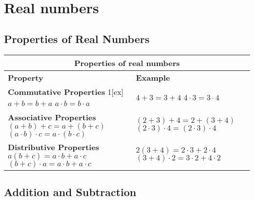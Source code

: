 \section{Real numbers}

\subsection{Properties of Real Numbers}

\begin{tabularx}{1\textwidth}{
    p{}
    p{}
}
\toprule
\multicolumn{2}{c}{\textbf{Properties of real numbers}} \\
\midrule

\textbf{Property} & \textbf{Example}\\
\midrule

\makecell[l]{
    \textbf{Commutative Properties} \\ 1[ex]
    $a + b = b + a$ \\ 
    $a \cdot b = b \cdot a$
} 
& 
\makecell[l]{
    $4 + 3 = 3 + 4$ \\ 
    $4 \cdot 3 = 3 \cdot 4$
} 
\\
\midrule

\makecell[l]{
    \textbf{Associative Properties} \\[1ex] 
    $(a + b) + c = a + (b + c)$ \\ 
    $(a \cdot b) \cdot c = a \cdot (b \cdot c)$
} 
&
\makecell[l]{
    $(2 + 3) + 4 = 2 + (3 + 4)$ \\ 
    $(2 \cdot 3) \cdot 4 = (2 \cdot 3) \cdot 4$
} 
\\

\midrule

\makecell[l]{
    \textbf{Distributive Properties} \\[1ex] 
    $a(b + c) = a \cdot b + a \cdot c$ \\ 
    $(b + c) \cdot a = a \cdot b + a \cdot c$
} 
& 
\makecell[l]{
    $2(3 + 4) = 2 \cdot 3 + 2 \cdot 4$ \\ 
    $(3 + 4) \cdot 2 = 3 \cdot 2 + 4 \cdot 2$
} 
\\  

\bottomrule
\end{tabularx}

\subsection{Addition and Subtraction}

